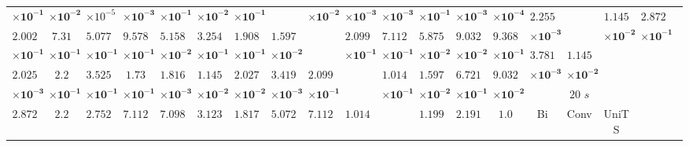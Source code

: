 \begin{table}[!ht]
{\begin{tabular}{|c|c|c|c|c|c|c|c|c|c|c|c|c|c|c|c|c|c|c|}
			$\mathbf{\times 10^{-1}}$ & $\mathbf{\times 10^{-2}}$ & $\times 10^{-5}$ & $\mathbf{\times 10^{-3}}$ & $\mathbf{\times 10^{-1}}$ & $\mathbf{\times 10^{-2}}$ & $\mathbf{\times 10^{-1}}$ & & $\mathbf{\times 10^{-2}}$ & $\mathbf{\times 10^{-3}}$ & $\mathbf{\times 10^{-3}}$ & $\mathbf{\times 10^{-1}}$ & $\mathbf{\times 10^{-3}}$ & $\mathbf{\times 10^{-4}}$ & $\mathbf{2.255}$ & \multirow{2}{*}{} & $\mathbf{1.145}$ & $\mathbf{2.872}$ & \multirow{2}{*}{} \\ \cline{1-14}
			$\mathbf{2.002}$ & $\mathbf{7.31}$ & $\mathbf{5.077}$ & $\mathbf{9.578}$ & $\mathbf{5.158}$ & $\mathbf{3.254}$ & $\mathbf{1.908}$ & $\mathbf{1.597}$ & \multirow{2}{*}{} & $\mathbf{2.099}$ & $\mathbf{7.112}$ & $\mathbf{5.875}$ & $\mathbf{9.032}$ & $\mathbf{9.368}$ & $\mathbf{\times 10^{-3}}$ & & $\mathbf{\times 10^{-2}}$ & $\mathbf{\times 10^{-1}}$ & \\ \cline{15-19}
			$\mathbf{\times 10^{-1}}$ & $\mathbf{\times 10^{-1}}$ & $\mathbf{\times 10^{-1}}$ & $\mathbf{\times 10^{-1}}$ & $\mathbf{\times 10^{-2}}$ & $\mathbf{\times 10^{-1}}$ & $\mathbf{\times 10^{-1}}$ & $\mathbf{\times 10^{-2}}$ & & $\mathbf{\times 10^{-1}}$ & $\mathbf{\times 10^{-1}}$ & $\mathbf{\times 10^{-2}}$ & $\mathbf{\times 10^{-2}}$ & $\mathbf{\times 10^{-1}}$ & $\mathbf{3.781}$ & $\mathbf{1.145}$ & \multirow{2}{*}{} & \multicolumn{2}{c}{} \\ \cline{1-14}
			$\mathbf{2.025}$ & $\mathbf{2.2}$ & $\mathbf{3.525}$ & $\mathbf{1.73}$ & $\mathbf{1.816}$ & $\mathbf{1.145}$ & $\mathbf{2.027}$ & $\mathbf{3.419}$ & $\mathbf{2.099}$ & \multirow{2}{*}{} & $\mathbf{1.014}$ & $\mathbf{1.597}$ & $\mathbf{6.721}$ & $\mathbf{9.032}$ & $\mathbf{\times 10^{-3}}$ & $\mathbf{\times 10^{-2}}$ & & \multicolumn{2}{c}{} \\ \cline{15-17}
			$\mathbf{\times 10^{-3}}$ & $\mathbf{\times 10^{-1}}$ & $\mathbf{\times 10^{-1}}$ & $\mathbf{\times 10^{-1}}$ & $\mathbf{\times 10^{-3}}$ & $\mathbf{\times 10^{-2}}$ & $\mathbf{\times 10^{-2}}$ & $\mathbf{\times 10^{-3}}$ & $\mathbf{\times 10^{-1}}$ & & $\mathbf{\times 10^{-1}}$ & $\mathbf{\times 10^{-2}}$ & $\mathbf{\times 10^{-1}}$ & $\mathbf{\times 10^{-2}}$ & \multicolumn{3}{c}{$20$ $s$} & \multicolumn{2}{c}{} \\ \cline{1-17}
			$\mathbf{2.872}$ & $\mathbf{2.2}$ & $\mathbf{2.752}$ & $\mathbf{7.112}$ & $\mathbf{7.098}$ & $\mathbf{3.123}$ & $\mathbf{1.817}$ & $\mathbf{5.072}$ & $\mathbf{7.112}$ & $\mathbf{1.014}$ & \multirow{2}{*}{} & $\mathbf{1.199}$ & $\mathbf{2.191}$ & \multirow{2}{*}{$\mathbf{1.0}$} & \multirow{2}{*}{Bi} & \multirow{2}{*}{Conv} & \multirow{2}{*}{UniTS} & \multicolumn{2}{c}{} \\ 

\end{tabular}}
\end{table}
